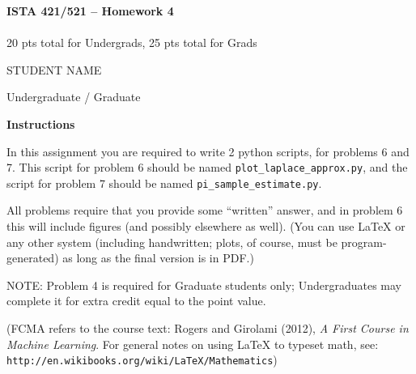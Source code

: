 \documentclass[10pt]{article}
\newcommand{\latex}{\LaTeX\xspace}
\begin{document}
\begin{center}
    {\Large {\bf ISTA 421/521 -- Homework 4}} \\
     \\
    20 pts total for Undergrads, 25 pts total for Grads\\
\end{center}

\begin{flushright}
STUDENT NAME %

Undergraduate / Graduate %
\end{flushright}

\vspace{1cm}
{\Large {\bf Instructions}}

In this assignment you are required to write 2 python scripts, for problems 6 and 7.  This script for problem 6 should be named {\tt plot\_laplace\_approx.py}, and the script for problem 7 should be named {\tt pi\_sample\_estimate.py}.

All problems require that you provide some ``written'' answer, and in problem 6 this will include figures (and possibly elsewhere as well).  (You can use \latex or any other system (including handwritten; plots, of course, must be program-generated) as long as the final version is in PDF.)


NOTE: Problem 4 is required for Graduate students only; Undergraduates may complete it for extra credit equal to the point value.

(FCMA refers to the course text: Rogers and Girolami (2012), {\em A First Course in Machine Learning}.  For general notes on using \latex to typeset math, see: {\tt http://en.wikibooks.org/wiki/LaTeX/Mathematics})
\vspace{.5cm}

\end{document}
